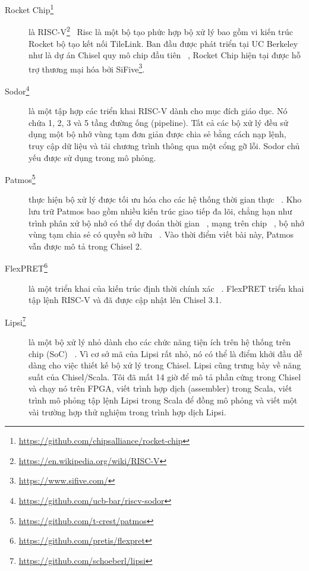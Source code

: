 \documentclass[%
    10pt,
    headinclude, footexclude,
    openright, %
    notitlepage,
    cleardoubleempty,
    headsepline,
    pointlessnumbers,
    bibtotoc, idxtotoc,
    ]{scrbook}
\newcommand{\myref}[2]{\href{#1}{#2}}
\renewcommand{\myref}[2]{{#2}{\footnote{\url{#1}}}}
\begin{document}
\begin{description}

\item[\myref{https://github.com/chipsalliance/rocket-chip}{Rocket Chip}]
là \myref{https://en.wikipedia.org/wiki/RISC-V}{RISC-V}~\cite{risc-v}
Risc là một bộ tạo phức hợp bộ xử lý bao gồm vi kiến trúc Rocket bộ tạo kết nối TileLink. Ban đầu được phát triển tại UC Berkeley như là dự án Chisel quy mô chip đầu tiên ~\cite{rocket:techrep}, Rocket Chip hiện tại được hỗ trợ thương mại hóa bởi \myref{https://www.sifive.com/}{SiFive}.

\item[\myref{https://github.com/ucb-bar/riscv-sodor}{Sodor}] là một tập hợp các triển khai RISC-V dành cho mục đích giáo dục. Nó chứa 1, 2, 3 và 5 tầng đường ống (pipeline). Tất cả các bộ xử lý đều sử dụng một bộ nhớ vùng tạm đơn giản được chia sẻ bằng cách nạp lệnh, truy cập dữ liệu và tải chương trình thông qua một cổng gỡ lỗi. Sodor chủ yếu được sử dụng trong mô phỏng. 

\item[\myref{https://github.com/t-crest/patmos}{Patmos}] thực hiện bộ xử lý được tối ưu hóa cho các hệ thống thời gian thực ~\cite{patmos:rts2018}. Kho lưu trữ Patmos bao gồm nhiều kiến trúc giao tiếp đa lõi, chẳng hạn như trình phân xử bộ nhớ có thể dự đoán thời gian ~\cite{t-crest:memnoc}, mạng trên chip ~\cite{s4nocni:arcs2019}, bộ nhớ vùng tạm chia sẻ có quyền sở hữu ~\cite{t-crest:ownspm}. Vào thời điểm viết bài này, Patmos vẫn được mô tả trong Chisel 2. 

\item[\myref{https://github.com/pretis/flexpret}{FlexPRET}] là một triển khai của kiến trúc định thời chính xác ~\cite{Zimmer:EECS-2015-181}. FlexPRET triển khai tập lệnh RISC-V và đã được cập nhật lên Chisel 3.1. 

\item[\myref{https://github.com/schoeberl/lipsi}{Lipsi}] là một bộ xử lý nhỏ dành cho các chức năng tiện ích trên hệ thống trên chip (SoC) ~\cite{lipsi:arcs2018}. Vì cơ sở mã của Lipsi rất nhỏ, nó có thể là điểm khởi đầu dễ dàng cho việc thiết kế bộ xử lý trong Chisel. Lipsi cũng trưng bày về năng suất của Chisel/Scala. Tôi đã mất 14 giờ để mô tả phần cứng trong Chisel và chạy nó trên FPGA, viết trình hợp dịch (assembler) trong Scala, viết trình mô phỏng tập lệnh Lipsi trong Scala để đồng mô phỏng và viết một vài trường hợp thử nghiệm trong trình hợp dịch Lipsi. 


\end{description}
\end{document}

